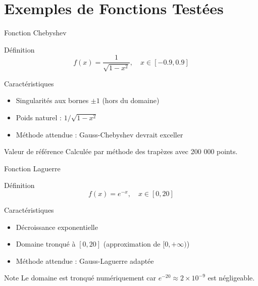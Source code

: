 \documentclass[aspectratio=169,11pt]{beamer}
\begin{document}
\section{Exemples de Fonctions Testées}

\begin{frame}{Fonction Chebyshev}
\vspace{-0.2cm}
\begin{block}{Définition}
\small
\begin{equation}
f(x) = \frac{1}{\sqrt{1-x^2}}, \quad x \in [-0.9, 0.9]
\end{equation}
\end{block}

\vspace{-0.15cm}
\begin{block}{Caractéristiques}
\small
\begin{itemize}
\item Singularités aux bornes $\pm 1$ (hors du domaine)
\item Poids naturel : $1/\sqrt{1-x^2}$
\item Méthode attendue : Gauss-Chebyshev devrait exceller
\end{itemize}
\end{block}

\vspace{-0.15cm}
\begin{block}{Valeur de référence}
\small Calculée par méthode des trapèzes avec 200 000 points.
\end{block}
\end{frame}

\begin{frame}{Fonction Laguerre}
\vspace{-0.2cm}
\begin{block}{Définition}
\small
\begin{equation}
f(x) = e^{-x}, \quad x \in [0, 20]
\end{equation}
\end{block}

\vspace{-0.15cm}
\begin{block}{Caractéristiques}
\small
\begin{itemize}
\item Décroissance exponentielle
\item Domaine tronqué à $[0,20]$ (approximation de $[0,+\infty)$)
\item Méthode attendue : Gauss-Laguerre adaptée
\end{itemize}
\end{block}

\vspace{-0.15cm}
\begin{block}{Note}
\small Le domaine est tronqué numériquement car $e^{-20} \approx 2 \times 10^{-9}$ est négligeable.
\end{block}
\end{frame}
\end{document}
